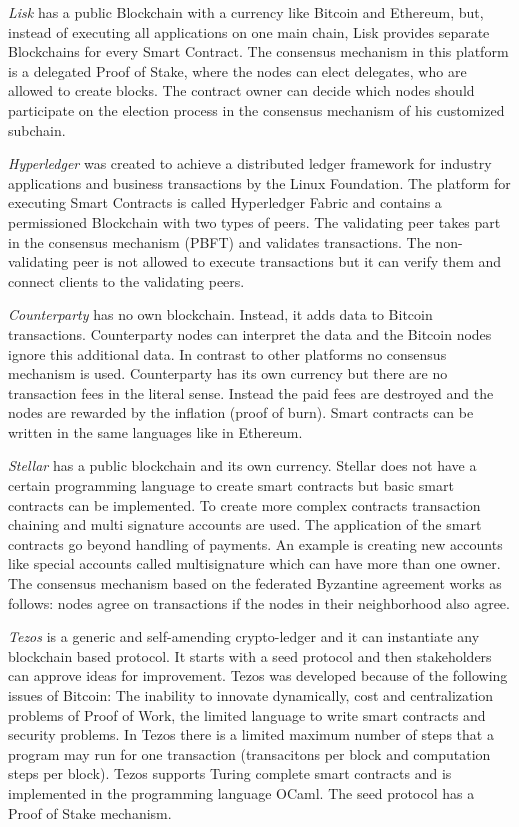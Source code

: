 \documentclass[conference]{IEEEtran}
\begin{document}
\textit{Lisk} has a public Blockchain with a currency like Bitcoin and Ethereum, but, instead of executing all applications on one main chain, Lisk provides separate Blockchains for every Smart Contract. The consensus mechanism in this platform is a delegated Proof of Stake, where the nodes can elect delegates, who are allowed to create blocks. The contract owner can decide which nodes should participate on the election process in the consensus mechanism of his customized subchain. \cite{Bartoletti2017} \par 
\textit{Hyperledger} was created to achieve a distributed ledger framework for industry applications and business transactions by the Linux Foundation. The platform for executing Smart Contracts is called Hyperledger Fabric and contains a permissioned Blockchain with two types of peers. The validating peer takes part in the consensus mechanism (PBFT) and validates transactions. The non-validating peer is not allowed to execute transactions but it can verify them and connect clients to the validating peers.\cite{Cachin2016} \par 
\textit{Counterparty} has no own blockchain. Instead, it adds data to Bitcoin transactions. Counterparty nodes can interpret the data and the Bitcoin nodes ignore this additional data. In contrast to other platforms no consensus mechanism is used. Counterparty has its own currency but there are no transaction fees in the literal sense. Instead the paid fees are destroyed and the nodes are rewarded by the inflation (proof of burn). Smart contracts can be written in the same languages like in Ethereum. \cite{Bartoletti2017} \par 
\textit{Stellar} has a public blockchain and its own currency. Stellar does not have a certain programming language to create smart contracts but basic smart contracts can be implemented. To create more complex contracts transaction chaining and multi signature accounts are used. The application of the smart contracts go beyond handling of payments. An example is creating new accounts like special accounts called multisignature which can have more than one owner. The consensus mechanism based on the federated Byzantine agreement works as follows: nodes agree on transactions if the nodes in their neighborhood also agree. \cite{Bartoletti2017} \par 
\textit{Tezos} is a generic and self-amending crypto-ledger and it can instantiate any blockchain based protocol. It starts with a seed protocol and then stakeholders can approve ideas for improvement. Tezos was developed because of the following issues of Bitcoin: The inability to innovate dynamically, cost and centralization problems of Proof of Work, the limited language to write smart contracts and security problems. In Tezos there is a limited maximum number of steps that a program may run for one transaction (transacitons per block and computation steps per block). Tezos supports Turing complete smart contracts and is implemented in the programming language OCaml. The seed protocol has a Proof of Stake mechanism. \cite{Goodman2014} \cite{Goodman2014a} \par 
\end{document}

